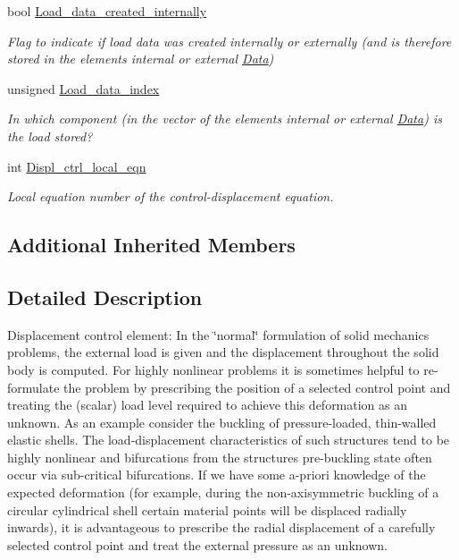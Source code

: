 \begin{DoxyCompactItemize}
bool \hyperlink{classoomph_1_1DisplacementControlElement_ac555d29e8d7bfa183b465eef8d40a761}{Load\+\_\+data\+\_\+created\+\_\+internally}
\begin{DoxyCompactList}\small\item\em Flag to indicate if load data was created internally or externally (and is therefore stored in the element\textquotesingle{}s internal or external \hyperlink{classoomph_1_1Data}{Data}) \end{DoxyCompactList}\item 
unsigned \hyperlink{classoomph_1_1DisplacementControlElement_a9837d5e0ce72dfb0a05d3f93b0a54ee0}{Load\+\_\+data\+\_\+index}
\begin{DoxyCompactList}\small\item\em In which component (in the vector of the element\textquotesingle{}s internal or external \hyperlink{classoomph_1_1Data}{Data}) is the load stored? \end{DoxyCompactList}\item 
int \hyperlink{classoomph_1_1DisplacementControlElement_af9df9b436aa9bffa964618f319cbd9ed}{Displ\+\_\+ctrl\+\_\+local\+\_\+eqn}
\begin{DoxyCompactList}\small\item\em Local equation number of the control-\/displacement equation. \end{DoxyCompactList}\end{DoxyCompactItemize}
\subsection*{Additional Inherited Members}


\subsection{Detailed Description}
Displacement control element\+: In the \char`\"{}normal\char`\"{} formulation of solid mechanics problems, the external load is given and the displacement throughout the solid body is computed. For highly nonlinear problems it is sometimes helpful to re-\/formulate the problem by prescribing the position of a selected control point and treating the (scalar) load level required to achieve this deformation as an unknown. As an example consider the buckling of pressure-\/loaded, thin-\/walled elastic shells. The load-\/displacement characteristics of such structures tend to be highly nonlinear and bifurcations from the structure\textquotesingle{}s pre-\/buckling state often occur via sub-\/critical bifurcations. If we have some a-\/priori knowledge of the expected deformation (for example, during the non-\/axisymmetric buckling of a circular cylindrical shell certain material points will be displaced radially inwards), it is advantageous to prescribe the radial displacement of a carefully selected control point and treat the external pressure as an unknown. 

